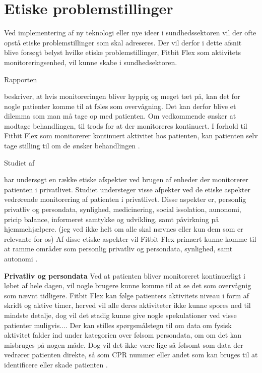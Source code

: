 \section{Etiske problemstillinger}

Ved implementering af ny teknologi eller nye ideer i sundhedssektoren vil der ofte opstå etiske problemstillinger som skal adreseres. Der vil derfor i dette afsnit blive forsøgt belyst hvilke etiske problemstillinger, Fitbit Flex som aktivitets monitoreringsenhed, vil kunne skabe i sundhedsektoren.

Rapporten \author{patienthome2015} beskriver, at hvis monitoreringen bliver hyppig og meget tæt på, kan det for nogle patienter komme til at føles som overvågning. Det kan derfor blive et dilemma som man må tage op med patienten. Om vedkommende ønsker at modtage behandlingen, til trods for at der monitoreres kontinuert. I forhold til Fitbit Flex som monitorerer kontinuert aktivitet hos patienten, kan patienten selv tage stilling til om de ønsker behandlingen \citep{patienthome2015}.

Studiet af \author{Mittelstand2011} har undersøgt en række etiske afspekter ved brugen af enheder der monitorerer patienten i privatlivet. Studiet understeger visse afpekter ved de etiske aspekter vedrørende monitorering af patienten i privatlivet. Disse aspekter er, personlig privatliv og persondata, synlighed, medicinering, social issolation, aunonomi, pricip balance, informeret samtykke og udvikling, samt påvirkning på hjemmehjælpere. (jeg ved ikke helt om alle skal nævnes eller kun dem som er relevante for os) 
Af disse etiske aspekter vil Fitbit Flex primært kunne komme til at ramme områder som personlig privatliv og persondata, synlighed, samt autonomi \citep{Mittelstand2011}.

\textbf{Privatliv og persondata}
Ved at patienten bliver monitoreret kontinuerligt i løbet af hele dagen, vil nogle brugere kunne komme til at se det som overvågnig som nævnt tidligere. Fitbit Flex kan følge patienters aktivitets niveau i form af skridt og aktive timer, herved vil alle deres aktiviteter ikke kunne spores ned til mindste detalje, dog vil det stadig kunne give nogle spekulationer ved visse patienter muligvis....
Der kan stilles spørgsmålstegn til om data om fysisk aktivitet falder ind under kategorien over følsom persondata, om om det kan misbruges på nogen måde. Dog vil det ikke være lige så følsomt som data der vedrører patienten direkte, så som CPR nummer eller andet som kan bruges til at identificere eller skade patienten \citep{Mittelstand2011}.

